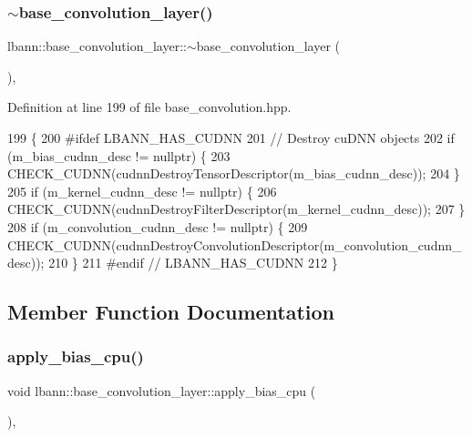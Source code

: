 \subsubsection{\texorpdfstring{$\sim$base\+\_\+convolution\+\_\+layer()}{~base\_convolution\_layer()}}
{\footnotesize\ttfamily lbann\+::base\+\_\+convolution\+\_\+layer\+::$\sim$base\+\_\+convolution\+\_\+layer (\begin{DoxyParamCaption}{ }\end{DoxyParamCaption})\hspace{0.3cm}{\ttfamily [inline]}, {\ttfamily [override]}}



Definition at line 199 of file base\+\_\+convolution.\+hpp.


\begin{DoxyCode}
199                                      \{
200 \textcolor{preprocessor}{  #ifdef LBANN\_HAS\_CUDNN}
201     \textcolor{comment}{// Destroy cuDNN objects}
202     \textcolor{keywordflow}{if} (m\_bias\_cudnn\_desc != \textcolor{keyword}{nullptr}) \{
203       CHECK\_CUDNN(cudnnDestroyTensorDescriptor(m\_bias\_cudnn\_desc));
204     \}
205     \textcolor{keywordflow}{if} (m\_kernel\_cudnn\_desc != \textcolor{keyword}{nullptr}) \{
206       CHECK\_CUDNN(cudnnDestroyFilterDescriptor(m\_kernel\_cudnn\_desc));
207     \}
208     \textcolor{keywordflow}{if} (m\_convolution\_cudnn\_desc != \textcolor{keyword}{nullptr}) \{
209       CHECK\_CUDNN(cudnnDestroyConvolutionDescriptor(m\_convolution\_cudnn\_desc));
210     \}
211 \textcolor{preprocessor}{  #endif // LBANN\_HAS\_CUDNN}
212   \}
\end{DoxyCode}


\subsection{Member Function Documentation}
\mbox{\label{classlbann_1_1base__convolution__layer_a4f792e1c19d4591f305880b57f63cec3}} 
\subsubsection{\texorpdfstring{apply\+\_\+bias\+\_\+cpu()}{apply\_bias\_cpu()}}
{\footnotesize\ttfamily void lbann\+::base\+\_\+convolution\+\_\+layer\+::apply\+\_\+bias\+\_\+cpu (\begin{DoxyParamCaption}{ }\end{DoxyParamCaption})\hspace{0.3cm}{\ttfamily [inline]}, {\ttfamily [protected]}}



